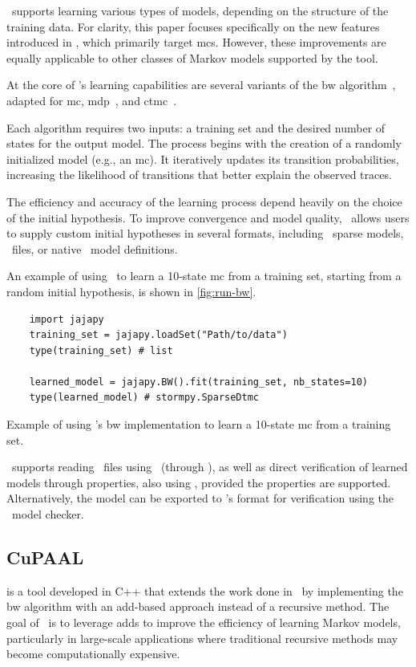 \Jajapy\ supports learning various types of models, depending on the structure of the training data.
For clarity, this paper focuses specifically on the new features introduced in \JajapyTwo, which primarily target \glspl{mc}.
However, these improvements are equally applicable to other classes of Markov models supported by the tool.

At the core of \Jajapy's learning capabilities are several variants of the \gls{bw} algorithm~\cite{Baum70,Rabiner89}, adapted for \gls{mc}, \gls{mdp}~\cite{BacciILR21}, and \gls{ctmc}~\cite{BacciILR23}.

Each algorithm requires two inputs: a training set and the desired number of states for the output model.
The process begins with the creation of a randomly initialized model (e.g., an \gls{mc}). It iteratively updates its transition probabilities, increasing the likelihood of transitions that better explain the observed traces.

The efficiency and accuracy of the learning process depend heavily on the choice of the initial hypothesis.
To improve convergence and model quality, \Jajapy\ allows users to supply custom initial hypotheses in several formats, including \Stormpy~sparse models, \Prism\ files, or native \Jajapy\ model definitions.

An example of using \Jajapy\ to learn a 10-state \gls{mc} from a training set, starting from a random initial hypothesis, is shown in \autoref{fig:run-bw}.


\begin{listing}
    \begin{verbatim} 
    import jajapy
    training_set = jajapy.loadSet("Path/to/data")
    type(training_set) # list 

    learned_model = jajapy.BW().fit(training_set, nb_states=10)
    type(learned_model) # stormpy.SparseDtmc 
    \end{verbatim}
    \caption{Example of using \Jajapy's \gls{bw} implementation to learn a 10-state \gls{mc} from a training set.}
    \label{fig:run-bw}
\end{listing}


\Jajapy\ supports reading \Prism\ files using \Storm\ (through \Stormpy), as well as direct verification of learned models through properties, also using \Storm, provided the properties are supported. Alternatively, the model can be exported to \Prism's format for verification using the \Prism\ model checker.


\subsection{CuPAAL}\label{subsec:cupaal}
\Cupaal is a tool developed in C++ that extends the work done in \Jajapy\ by implementing the \gls{bw} algorithm with an \gls{add}-based approach instead of a recursive method.
The goal of \Cupaal\ is to leverage \glspl{add} to improve the efficiency of learning Markov models, particularly in large-scale applications where traditional recursive methods may become computationally expensive.

